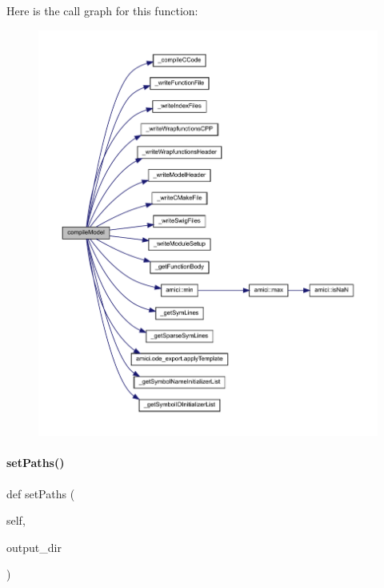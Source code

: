 Here is the call graph for this function\+:
\nopagebreak
\begin{figure}[H]
\begin{center}
\leavevmode
\includegraphics[width=350pt]{classamici_1_1ode__export_1_1_o_d_e_exporter_a61bf03049b9989d73b584fbca9f8d499_cgraph}
\end{center}
\end{figure}
\mbox{\label{classamici_1_1ode__export_1_1_o_d_e_exporter_a30886da9525f87826d3da2543a4aebbd}} 
\paragraph{\texorpdfstring{set\+Paths()}{setPaths()}}
{\footnotesize\ttfamily def set\+Paths (\begin{DoxyParamCaption}\item[{}]{self,  }\item[{}]{output\+\_\+dir }\end{DoxyParamCaption})}


